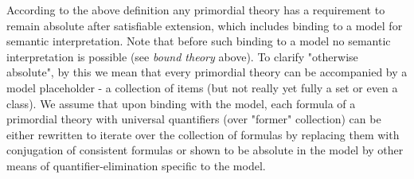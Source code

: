 According to the above definition any primordial theory has a requirement to remain absolute after satisfiable extension, which includes binding to a model for semantic interpretation. Note that before such binding to a model no semantic interpretation is possible (see \textit{bound theory} above). To clarify "otherwise absolute", by this we mean that every primordial theory can be accompanied by a model placeholder - a collection of items (but not really yet fully a set or even a class). We assume that upon binding with the model, each formula of a primordial theory with universal quantifiers (over "former" collection) can be either rewritten to iterate over the collection of formulas by replacing them with conjugation of consistent formulas or shown to be absolute in the model by other means of quantifier-elimination specific to the model.

